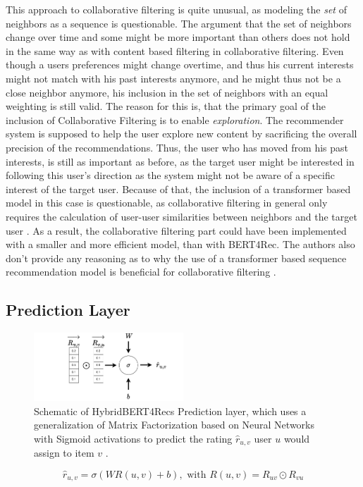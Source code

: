 \documentclass{Academic}
\begin{document}
        This approach to collaborative filtering is quite unusual, as modeling the \textit{set} of neighbors as a sequence is questionable. The argument that the set of neighbors change over time and some might be more important than others does not hold in the same way as with content based filtering in collaborative filtering. Even though a users preferences might change overtime, and thus his current interests might not match with his past interests anymore, and he might thus not be a close neighbor anymore, his inclusion in the set of neighbors with an equal weighting is still valid. The reason for this is, that the primary goal of the inclusion of Collaborative Filtering is to enable \textit{exploration}. The recommender system is supposed to help the user explore new content by sacrificing the overall precision of the recommendations. Thus, the user who has moved from his past interests, is still as important as before, as the target user might be interested in following this user's direction as the system might not be aware of a specific interest of the target user. Because of that, the inclusion of a transformer based model in this case is questionable, as collaborative filtering in general only requires the calculation of user-user similarities between neighbors and the target user \cite{channarongHybridBERT4RecHybridContentBased2022}. As a result, the collaborative filtering part could have been implemented with a smaller and more efficient model, than with BERT4Rec. The authors also don't provide any reasoning as to why the use of a transformer based sequence recommendation model is beneficial for collaborative filtering \cite{channarongHybridBERT4RecHybridContentBased2022}.

        \subsection{Prediction Layer}
        \begin{figure}[ht!]
            \centering
            \includegraphics[width=0.5\textwidth]{images/Prediction_Layer.pdf}
            \caption{Schematic of HybridBERT4Recs Prediction layer, which uses a generalization of Matrix Factorization based on Neural Networks with Sigmoid activations to predict the rating $\hat{r}_{u,v}$ user $u$ would assign to item $v$ \cite{channarongHybridBERT4RecHybridContentBased2022}.}
            \label{fig:pred_layer}
        \end{figure}
        \begin{equation}
            \hat{r}_{u,v} = \sigma(WR(u,v) + b), \text{ with }
            R(u,v) = R_{uv} \odot R_{vu}
        \end{equation}
\end{document}

